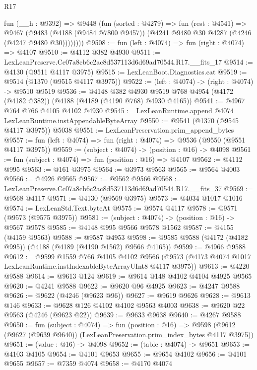 \begin{lexlean}{R17}
\begin{coremodule}
        fun (__h : @9392) =>
        @9448
          (fun (sorted : @4279) =>
          fun (rest : @4541) =>
          @9467
            (@9483
              (@4188 (@9484 @7800 @9457))
              (@4241 @9480 @30 @4287 (@4246 (@4247 @9480 @30))))))))
@9508 := fun (left : @4074) => fun (right : @4074) => @4107
@9510 := @4112 @382 @4930
@9511 := LexLeanPreserve.Cc07a8cb6c2ac8d537113d6d69ad70544.R17.__fits_17
@9514 := @4130 (@9511 @4117 @3975)
@9515 := LexLeanBoot.Diagnostics.cat
@9519 := @9514 (@1370 (@9515 @4117 @3975))
@9522 := (left : @4074) -> (right : @4074) -> @9510 @9519
@9536 := @4148
    @382
    @4930
    @9519
    @768
    @4954
    (@4172 (@4182 @382))
    (@4188 (@4189 (@4190 @768) @4930 @4165))
@9541 := @4967 @764 @766 @4105 @4102 @4930
@9545 := LexLeanRuntime.append @4074 LexLeanRuntime.instAppendableByteArray
@9550 := @9541 (@1370 (@9545 @4117 @3975)) @5038
@9551 := LexLeanPreservation.prim_append_bytes
@9557 := fun (left : @4074) => fun (right : @4074) => @9536 (@9550 (@9551 @4117 @3975))
@9559 := (subject : @4074) -> (position : @16) -> @4098
@9561 := fun (subject : @4074) => fun (position : @16) => @4107
@9562 := @4112 @995
@9563 := @161 @3975
@9564 := @3973 @9563
@9565 := @9564 @4003
@9566 := @4926 @9565
@9567 := @9562 @9566
@9568 := LexLeanPreserve.Cc07a8cb6c2ac8d537113d6d69ad70544.R17.__fits_37
@9569 := @9568 @4117
@9571 := @4130 (@9569 @3975)
@9573 := @4034 @1017 @1016
@9574 := LexLeanStd.Text.byteAt
@9575 := @9574 @4117
@9578 := @9571 (@9573 (@9575 @3975))
@9581 := (subject : @4074) -> (position : @16) -> @9567 @9578
@9585 := @4148 @995 @9566 @9578 @1562
@9587 := @4155 (@4159 @9563)
@9588 := @9587 @4953
@9598 := @9585 @9588 (@4172 (@4182 @995)) (@4188 (@4189 (@4190 @1562) @9566 @4165))
@9599 := @4966 @9588
@9612 := @9599
    @1559
    @766
    @4105
    @4102
    @9566
    (@9573 (@4173 @4074 @1017 LexLeanRuntime.instIndexableByteArrayUInt8 @4117 @3975))
@9613 := @4220 @9588
@9614 := @9613 @124
@9619 := @9614 @148 @4102 @4104 @4925 @9565
@9620 := @4241 @9588
@9622 := @9620 @96 @4925
@9623 := @4247 @9588
@9626 := @9622 (@4246 (@9623 @96))
@9627 := @9619 @9626
@9628 := @9613 @146
@9633 := @9628 @126 @4102 @4102 @9563 @4003
@9638 := @9620 @22 @9563 (@4246 (@9623 @22))
@9639 := @9633 @9638
@9640 := @4267 @9588
@9650 := fun (subject : @4074) =>
  fun (position : @16) =>
  @9598 (@9612 (@9627 (@9639 @9640)) (LexLeanPreservation.prim_index_bytes @4117 @3975))
@9651 := (value : @16) -> @4098
@9652 := (table : @4074) -> @9651
@9653 := @4103 @4105
@9654 := @4101 @9653
@9655 := @9654 @4102
@9656 := @4101 @9655
@9657 := @7359 @4074
@9658 := @4170 @4074

\end{coremodule}
\end{lexlean}
